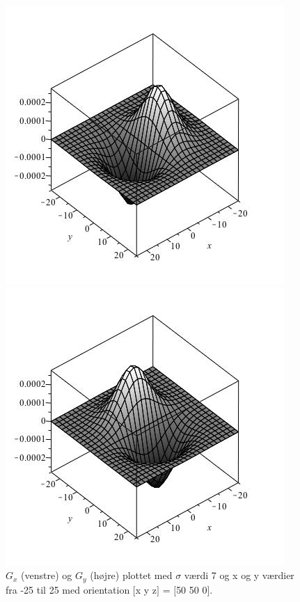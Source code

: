 \begin{figure}[H]
	\begin{minipage}[b]{0.5\linewidth}
		\includegraphics[scale=0.5]{files/premethod/img/g_x.jpg}
	\end{minipage}
	\hspace{0.5cm}
	\begin{minipage}[b]{0.5\linewidth}
		\includegraphics[scale=0.5]{files/premethod/img/g_y.jpg}
	\end{minipage}
	\caption{$G_x$ (venstre) og $G_y$ (højre) plottet med $\sigma$ værdi 7 og x og y værdier fra -25 til 25 med orientation $[$x y z$]$ = $[$50 50 0$]$.\label{fig:premethod_gxgy}}
\end{figure}

